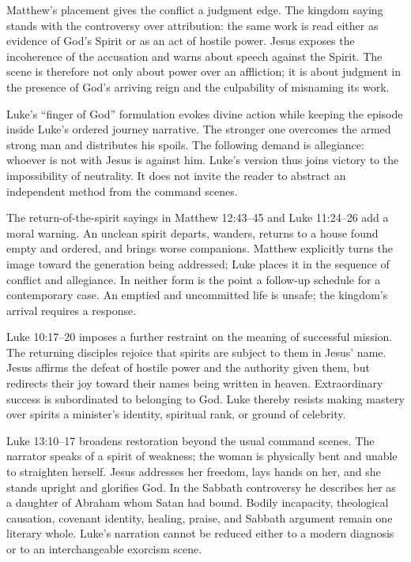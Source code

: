 Matthew's placement gives the conflict a judgment edge. The kingdom saying
stands with the controversy over attribution: the same work is read either
as evidence of God's Spirit or as an act of hostile power. Jesus exposes the
incoherence of the accusation and warns about speech against the Spirit.
The scene is therefore not only about power over an affliction; it is about
judgment in the presence of God's arriving reign and the culpability of
misnaming its work.

Luke's ``finger of God'' formulation evokes divine action while keeping the
episode inside Luke's ordered journey narrative. The stronger one overcomes
the armed strong man and distributes his spoils. The following demand is
allegiance: whoever is not with Jesus is against him. Luke's version thus
joins victory to the impossibility of neutrality. It does not invite the
reader to abstract an independent method from the command scenes.

The return-of-the-spirit sayings in Matthew 12:43--45 and Luke 11:24--26 add a
moral warning. An unclean spirit departs, wanders, returns to a house found
empty and ordered, and brings worse companions. Matthew explicitly turns the
image toward the generation being addressed; Luke places it in the sequence
of conflict and allegiance. In neither form is the point a follow-up schedule
for a contemporary case. An emptied and uncommitted life is unsafe; the
kingdom's arrival requires a response.

Luke 10:17--20 imposes a further restraint on the meaning of successful
mission. The returning disciples rejoice that spirits are subject to them in
Jesus' name. Jesus affirms the defeat of hostile power and the authority
given them, but redirects their joy toward their names being written in
heaven. Extraordinary success is subordinated to belonging to God. Luke
thereby resists making mastery over spirits a minister's identity, spiritual
rank, or ground of celebrity.

Luke 13:10--17 broadens restoration beyond the usual command scenes. The
narrator speaks of a spirit of weakness; the woman is physically bent and
unable to straighten herself. Jesus addresses her freedom, lays hands on her,
and she stands upright and glorifies God. In the Sabbath controversy he
describes her as a daughter of Abraham whom Satan had bound. Bodily
incapacity, theological causation, covenant identity, healing, praise, and
Sabbath argument remain one literary whole. Luke's narration cannot be
reduced either to a modern diagnosis or to an interchangeable exorcism scene.

